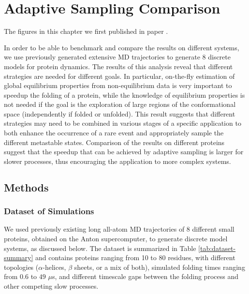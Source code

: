 \afterpage{\null\newpage}
\chapter{Adaptive Sampling Comparison\label{ch:chapter32}}


The figures in this chapter we first published in paper \cite{Adstrategies2018}.


In order to be able to benchmark and compare the results on different systems, we
use previously generated extensive MD trajectories \cite{lindorff2011} to
generate 8 discrete models for protein dynamics.
The results of this analysis reveal that different strategies are needed
for different goals. In particular, on-the-fly estimation of global
equilibrium properties from non-equilibrium data is very important to speedup
the folding of a protein, while the knowledge of equilibrium properties is not
needed if the goal is the exploration of large regions of the conformational
space (independently if folded or unfolded). This result suggests that
different strategies may need to
be combined in various stages of a specific application to both enhance the
occurrence of a rare event and appropriately sample the different metastable states.
Comparison of the results on different proteins
suggest that the speedup that can be achieved by adaptive sampling is larger
for slower processes, thus encouraging the application to more complex systems.



\section{\label{sec:methods}Methods}


\subsection{\label{sec:methods-dataset}Dataset of Simulations}

We used previously existing long all-atom MD trajectories
of 8 different small proteins\cite{lindorff2011}, obtained on the Anton supercomputer, to generate
discrete model systems, as discussed below. The dataset is summarized in Table
\ref{tab:dataset-summary} and contains proteins ranging from 10 to 80 residues,
with different topologies ($\alpha$-helices, $\beta$ sheets, or a mix of both),
simulated folding times ranging from $0.6$ to $49$ $\mu$s, and different timescale gaps between
the folding process and other competing slow processes.

